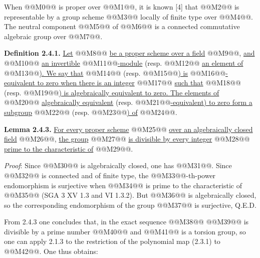 
When @@M0@@ is proper over @@M1@@, it is known [4] that @@M2@@ is representable by a group scheme @@M3@@ locally of finite type over @@M4@@. The neutral component @@M5@@ of @@M6@@ is a connected commutative algebraic group over @@M7@@.

\textbf{Definition 2.4.1.} \uline{Let} @@M8@@ \uline{be a proper scheme over a field} @@M9@@, \uline{and} @@M10@@ \uline{an invertible} @@M11@@\uline{-module} (resp. @@M12@@ \uline{an element of} @@M13@@\uline{). We say that} @@M14@@ (resp. @@M15@@\uline{) is} @@M16@@\uline{-equivalent to zero when there is an integer} @@M17@@ \uline{such that} @@M18@@ (resp. @@M19@@\uline{) is algebraically equivalent to zero. The elements of} @@M20@@ \uline{algebraically equivalent} (resp. @@M21@@\uline{-equivalent) to zero form a subgroup} @@M22@@ (resp. @@M23@@\uline{) of} @@M24@@.

\textbf{Lemma 2.4.3.} \uline{For every proper scheme} @@M25@@ \uline{over an algebraically closed field} @@M26@@, \uline{the group} @@M27@@ \uline{is divisible by every integer} @@M28@@ \uline{prime to the characteristic of} @@M29@@.

\emph{Proof}: Since @@M30@@ is algebraically closed, one has @@M31@@. Since @@M32@@ is connected and of finite type, the @@M33@@-th-power endomorphism is surjective when @@M34@@ is prime to the characteristic of @@M35@@ (SGA 3 XV 1.3 and VI 1.3.2). But @@M36@@ is algebraically closed, so the corresponding endomorphism of the group @@M37@@ is surjective, Q.E.D.

From 2.4.3 one concludes that, in the exact sequence
@@M38@@
@@M39@@ is divisible by a prime number @@M40@@ and @@M41@@ is a torsion group, so one can apply 2.1.3 to the restriction of the polynomial map (2.3.1) to @@M42@@. One thus obtains:

